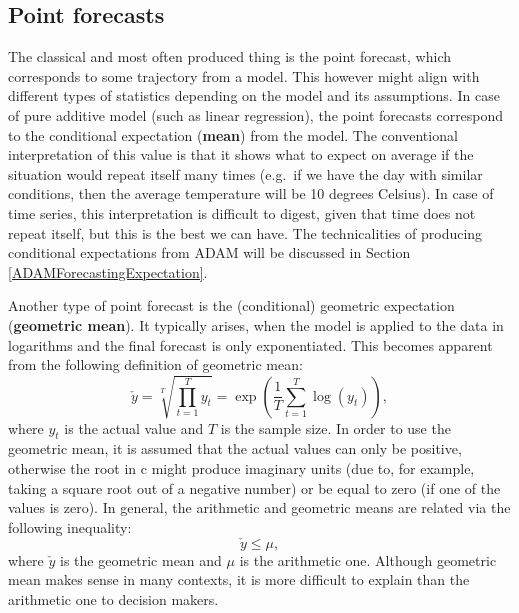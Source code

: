 \documentclass[
]{book}
\theoremstyle{definition}
\theoremstyle{definition}
\theoremstyle{definition}
\theoremstyle{definition}
\theoremstyle{remark}
\begin{document}
\hypertarget{typesOfForecastsPoint}{%
\subsection{Point forecasts}\label{typesOfForecastsPoint}}

The classical and most often produced thing is the point forecast, which corresponds to some trajectory from a model. This however might align with different types of statistics depending on the model and its assumptions. In case of pure additive model (such as linear regression), the point forecasts correspond to the conditional expectation (\textbf{mean}) from the model. The conventional interpretation of this value is that it shows what to expect on average if the situation would repeat itself many times (e.g.~if we have the day with similar conditions, then the average temperature will be 10 degrees Celsius). In case of time series, this interpretation is difficult to digest, given that time does not repeat itself, but this is the best we can have. The technicalities of producing conditional expectations from ADAM will be discussed in Section \ref{ADAMForecastingExpectation}.

Another type of point forecast is the (conditional) geometric expectation (\textbf{geometric mean}). It typically arises, when the model is applied to the data in logarithms and the final forecast is only exponentiated. This becomes apparent from the following definition of geometric mean:
\begin{equation}
    \check{y} = \sqrt[T]{\prod_{t=1}^T y_t} = \exp \left(\frac{1}{T} \sum_{t=1}^T \log(y_t) \right) ,
    \label{eq:GeoMean}
\end{equation}
where \(y_t\) is the actual value and \(T\) is the sample size. In order to use the geometric mean, it is assumed that the actual values can only be positive, otherwise the root in c might produce imaginary units (due to, for example, taking a square root out of a negative number) or be equal to zero (if one of the values is zero). In general, the arithmetic and geometric means are related via the following inequality:
\begin{equation}
    \check{y} \leq \mu ,
    \label{eq:GeoAndArithMeans}
\end{equation}
where \(\check{y}\) is the geometric mean and \(\mu\) is the arithmetic one. Although geometric mean makes sense in many contexts, it is more difficult to explain than the arithmetic one to decision makers.
\end{document}

